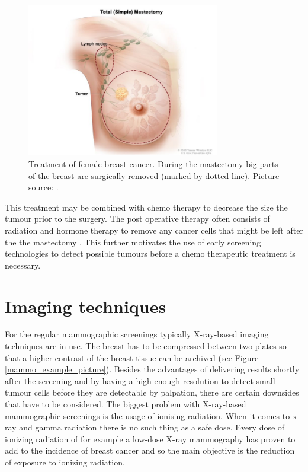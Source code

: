 \begin{figure}[H]
    \centering
    \includegraphics[width=0.75\textwidth]{Graphics/Mastectomy.jpg}
    \caption{Treatment of female breast cancer. During the mastectomy big parts of the breast are surgically removed (marked by dotted line). Picture source: \cite{NationalInstitutesofHealthNIH-NationalCancerInstituteNCIBreastTreatment}. }
    \label{mastecto_example_picture}
\end{figure}

This treatment may be combined with chemo therapy to decrease the size the tumour prior to the surgery. The post operative therapy often consists of radiation and hormone therapy to remove any cancer cells that might be left after the the mastectomy \cite{NationalInstitutesofHealthNIH-NationalCancerInstituteNCIBreastTreatment}.
This further motivates the use of early screening technologies to detect possible tumours before a chemo therapeutic treatment is necessary.




\section{Imaging techniques}
\label{Imaging_techniqe}


For the regular mammographic screenings typically X-ray-based imaging techniques are in use. The breast has to be compressed between two plates so that a higher contrast of the breast tissue can be archived (see Figure \ref{mammo_example_picture}). Besides the advantages of delivering results shortly after the screening and by having a high enough resolution to detect small tumour cells before they are detectable by palpation, there are certain downsides that have to be considered.
The biggest problem with X-ray-based mammographic screenings is the usage of ionising radiation. When it comes to x-ray and gamma radiation there is no such thing as a safe dose. Every dose of ionizing radiation of for example a low-dose X-ray mammography has proven to add to the incidence of breast cancer  \cite{Pauwels2015BreastRadiobiology} and so the main objective is the reduction of exposure to ionizing radiation.

